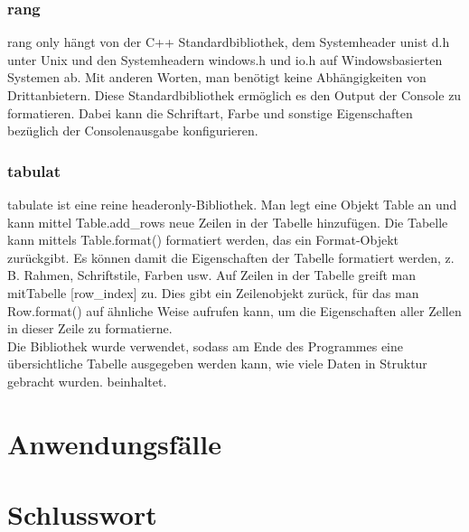 \documentclass[a4paper,12pt]{article}
\begin{document}
\subsubsection{rang}
rang only hängt von der C++ Standardbibliothek, dem Systemheader unist d.h unter Unix und den Systemheadern windows.h und io.h auf Windows\-basierten Systemen ab. Mit anderen Worten, man benötigt keine Abhängigkeiten von Drittanbietern. Diese Standardbibliothek ermöglich es den
Output der Console zu formatieren. Dabei kann die Schriftart, Farbe und sonstige Eigenschaften bezüglich der Consolenausgabe konfigurieren.
\newpage
\noindent
\subsubsection{tabulat}
tabulate ist eine reine headeronly-Bibliothek. 
Man legt eine Objekt Table an und kann mittel Table.add\_rows neue Zeilen in der Tabelle hinzufügen.
Die Tabelle kann mittels Table.format() formatiert werden, das ein Format-Objekt zurückgibt. 
Es können damit die Eigenschaften der Tabelle formatiert werden, z. B. Rahmen, Schriftstile, Farben usw.
Auf Zeilen in der Tabelle greift man mitTabelle [row\_index] zu. Dies gibt ein Zeilenobjekt zurück, für das man Row.format() auf ähnliche Weise aufrufen kann, um die Eigenschaften aller Zellen in dieser Zeile zu formatierne.\\
Die Bibliothek wurde verwendet, sodass am Ende des Programmes eine übersichtliche Tabelle ausgegeben werden kann, wie viele Daten in Struktur gebracht wurden.
beinhaltet.

\section{Anwendungsfälle}

\section{Schlusswort}
\newpage
\printbibliography
\end{document}
